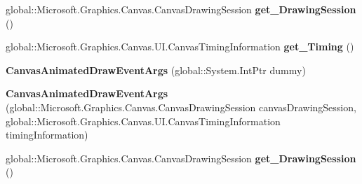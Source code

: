 \begin{DoxyCompactItemize}
\item 
\mbox{\label{class_microsoft_1_1_graphics_1_1_canvas_1_1_u_i_1_1_xaml_1_1_canvas_animated_draw_event_args_abbbe03755eef9ce5bdf4d9c05a8f521d}} 
global\+::\+Microsoft.\+Graphics.\+Canvas.\+Canvas\+Drawing\+Session {\bfseries get\+\_\+\+Drawing\+Session} ()
\item 
\mbox{\label{class_microsoft_1_1_graphics_1_1_canvas_1_1_u_i_1_1_xaml_1_1_canvas_animated_draw_event_args_a22d34a76080b643c84026f8d7acaf7dc}} 
global\+::\+Microsoft.\+Graphics.\+Canvas.\+U\+I.\+Canvas\+Timing\+Information {\bfseries get\+\_\+\+Timing} ()
\item 
\mbox{\label{class_microsoft_1_1_graphics_1_1_canvas_1_1_u_i_1_1_xaml_1_1_canvas_animated_draw_event_args_abfa7204a8fa459825847e3dc689bea45}} 
{\bfseries Canvas\+Animated\+Draw\+Event\+Args} (global\+::\+System.\+Int\+Ptr dummy)
\item 
\mbox{\label{class_microsoft_1_1_graphics_1_1_canvas_1_1_u_i_1_1_xaml_1_1_canvas_animated_draw_event_args_aac93ec47171428d3e94ed6fe14583c9b}} 
{\bfseries Canvas\+Animated\+Draw\+Event\+Args} (global\+::\+Microsoft.\+Graphics.\+Canvas.\+Canvas\+Drawing\+Session canvas\+Drawing\+Session, global\+::\+Microsoft.\+Graphics.\+Canvas.\+U\+I.\+Canvas\+Timing\+Information timing\+Information)
\item 
\mbox{\label{class_microsoft_1_1_graphics_1_1_canvas_1_1_u_i_1_1_xaml_1_1_canvas_animated_draw_event_args_abbbe03755eef9ce5bdf4d9c05a8f521d}} 
global\+::\+Microsoft.\+Graphics.\+Canvas.\+Canvas\+Drawing\+Session {\bfseries get\+\_\+\+Drawing\+Session} ()
\item 
\mbox{\label{class_microsoft_1_1_graphics_1_1_canvas_1_1_u_i_1_1_xaml_1_1_canvas_animated_draw_event_args_a22d34a76080b643c84026f8d7acaf7dc}} 

\end{DoxyCompactItemize}
